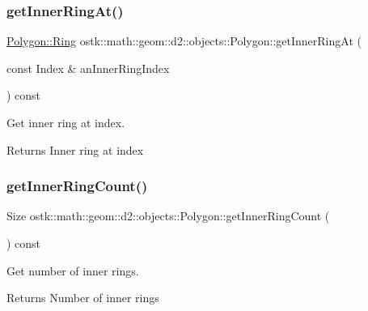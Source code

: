 \subsubsection{\texorpdfstring{get\+Inner\+Ring\+At()}{getInnerRingAt()}}
{\footnotesize\ttfamily \hyperlink{classostk_1_1math_1_1geom_1_1d2_1_1objects_1_1_polygon_a2cfc117e0bd669946a670640eae4ee4c}{Polygon\+::\+Ring} ostk\+::math\+::geom\+::d2\+::objects\+::\+Polygon\+::get\+Inner\+Ring\+At (\begin{DoxyParamCaption}\item[{const Index \&}]{an\+Inner\+Ring\+Index }\end{DoxyParamCaption}) const}



Get inner ring at index. 

\begin{DoxyReturn}{Returns}
Inner ring at index 
\end{DoxyReturn}
\mbox{\label{classostk_1_1math_1_1geom_1_1d2_1_1objects_1_1_polygon_a47930b6706bc8b54754e064f0d0ec29b}} 
\subsubsection{\texorpdfstring{get\+Inner\+Ring\+Count()}{getInnerRingCount()}}
{\footnotesize\ttfamily Size ostk\+::math\+::geom\+::d2\+::objects\+::\+Polygon\+::get\+Inner\+Ring\+Count (\begin{DoxyParamCaption}{ }\end{DoxyParamCaption}) const}



Get number of inner rings. 

\begin{DoxyReturn}{Returns}
Number of inner rings 
\end{DoxyReturn}
\mbox{\label{classostk_1_1math_1_1geom_1_1d2_1_1objects_1_1_polygon_a051e05d5e1a0e7e1a3e14fd7441ebbf0}} 
